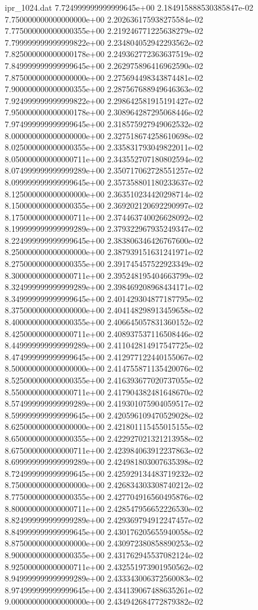 \begin{filecontents}{ipr_1024.dat}
7.724999999999999645e+00 2.184915888530385847e-02
7.750000000000000000e+00 2.202636175938275584e-02
7.775000000000000355e+00 2.219246771225638279e-02
7.799999999999999822e+00 2.234804052942293562e-02
7.825000000000000178e+00 2.249362772363637519e-02
7.849999999999999645e+00 2.262975896416962590e-02
7.875000000000000000e+00 2.275694498343874481e-02
7.900000000000000355e+00 2.287567688949646363e-02
7.924999999999999822e+00 2.298642581915191427e-02
7.950000000000000178e+00 2.308964287295068446e-02
7.974999999999999645e+00 2.318575927949062532e-02
8.000000000000000000e+00 2.327518674258610698e-02
8.025000000000000355e+00 2.335831793049822011e-02
8.050000000000000711e+00 2.343552707180802594e-02
8.074999999999999289e+00 2.350717062728551257e-02
8.099999999999999645e+00 2.357358801180233637e-02
8.125000000000000000e+00 2.363510234420298714e-02
8.150000000000000355e+00 2.369202120692290997e-02
8.175000000000000711e+00 2.374463740026628092e-02
8.199999999999999289e+00 2.379322967935249347e-02
8.224999999999999645e+00 2.383806346426767600e-02
8.250000000000000000e+00 2.387939151631241971e-02
8.275000000000000355e+00 2.391745457522923349e-02
8.300000000000000711e+00 2.395248195404663799e-02
8.324999999999999289e+00 2.398469208968434171e-02
8.349999999999999645e+00 2.401429304877187795e-02
8.375000000000000000e+00 2.404148298913459658e-02
8.400000000000000355e+00 2.406645057831360152e-02
8.425000000000000711e+00 2.408937537116508446e-02
8.449999999999999289e+00 2.411042814917547725e-02
8.474999999999999645e+00 2.412977122440155067e-02
8.500000000000000000e+00 2.414755871135420076e-02
8.525000000000000355e+00 2.416393677020737055e-02
8.550000000000000711e+00 2.417904382481648670e-02
8.574999999999999289e+00 2.419301075904059517e-02
8.599999999999999645e+00 2.420596109470529028e-02
8.625000000000000000e+00 2.421801115455015155e-02
8.650000000000000355e+00 2.422927021321213958e-02
8.675000000000000711e+00 2.423984063912237863e-02
8.699999999999999289e+00 2.424981803007635398e-02
8.724999999999999645e+00 2.425929134483719232e-02
8.750000000000000000e+00 2.426834303308740212e-02
8.775000000000000355e+00 2.427704916560495876e-02
8.800000000000000711e+00 2.428547956652226530e-02
8.824999999999999289e+00 2.429369794912247457e-02
8.849999999999999645e+00 2.430176205655940058e-02
8.875000000000000000e+00 2.430972380858890253e-02
8.900000000000000355e+00 2.431762945537082124e-02
8.925000000000000711e+00 2.432551973901950562e-02
8.949999999999999289e+00 2.433343006372560083e-02
8.974999999999999645e+00 2.434139067488635261e-02
9.000000000000000000e+00 2.434942684772879382e-02

\end{filecontents}
